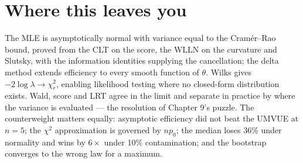 \documentclass[11pt]{article}
\begin{document}
\section*{Where this leaves you}
The MLE is asymptotically normal with variance equal to the Cram\'er--Rao bound, proved from the CLT on the score, the WLLN on the curvature and Slutsky, with the information identities supplying the cancellation; the delta method extends efficiency to every smooth function of $\theta$. Wilks gives $-2\log\lambda\to\chi^2_r$, enabling likelihood testing where no closed-form distribution exists. Wald, score and LRT agree in the limit and separate in practice by where the variance is evaluated --- the resolution of Chapter 9's puzzle. The counterweight matters equally: asymptotic efficiency did not beat the UMVUE at $n=5$; the $\chi^2$ approximation is governed by $np_0$; the median loses 36\% under normality and wins by $6\times$ under 10\% contamination; and the bootstrap converges to the wrong law for a maximum.
\end{document}

